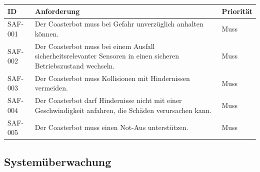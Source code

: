 \documentclass[
  a4paper,
  12pt,
  DIV=12,        %
  parskip=half,  %
  headings=small %
]{scrartcl}
\theoremstyle{definition}
\theoremstyle{definition}
\begin{document}
\begin{longtable}[]{@{}
  >{\raggedright\arraybackslash}p{}
  >{\raggedright\arraybackslash}p{}
  >{\raggedright\arraybackslash}p{}@{}}
\toprule\noalign{}
\begin{minipage}[b]{\linewidth}\raggedright
ID
\end{minipage} & \begin{minipage}[b]{\linewidth}\raggedright
Anforderung
\end{minipage} & \begin{minipage}[b]{\linewidth}\raggedright
Priorität
\end{minipage} \\
\midrule\noalign{}
\endhead
\bottomrule\noalign{}
\endlastfoot
SAF-001 & Der Coasterbot muss bei Gefahr unverzüglich anhalten können. &
Muss \\
SAF-002 & Der Coasterbot muss bei einem Ausfall sicherheitsrelevanter
Sensoren in einen sicheren Betriebszustand wechseln. & Muss \\
SAF-003 & Der Coasterbot muss Kollisionen mit Hindernissen vermeiden. &
Muss \\
SAF-004 & Der Coasterbot darf Hindernisse nicht mit einer
Geschwindigkeit anfahren, die Schäden verursachen kann. & Muss \\
SAF-005 & Der Coasterbot muss einen Not-Aus unterstützen. & Muss \\
\end{longtable}

\subsection{Systemüberwachung}\label{systemuxfcberwachung}
\end{document}

